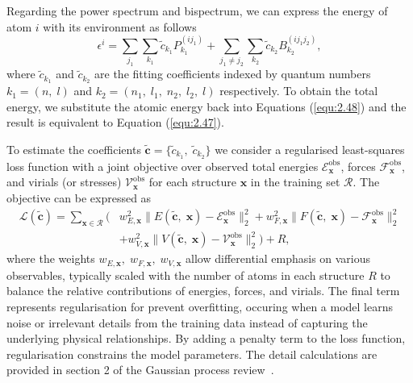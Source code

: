 Regarding the power spectrum and bispectrum, we can express the energy of atom $i$ with its environment as follows
\begin{equation}
    \label{equ:2.58}
      \epsilon^{i} = \sum_{j_{1}}\sum_{k_{1}}
      \tilde{c}_{k_{1}}
      P^{(ij_{1})}_{k_{1}} + \sum_{j_{1}\neq j_{2}}\sum_{k_{2}}
      \tilde{c}_{k_{2}}
      B^{(ij_{1}j_{2})}_{k_{2}}
      ,
\end{equation}
where $\tilde{c}_{k_{1}}$ and $\tilde{c}_{k_{2}}$ are the fitting coefficients indexed by quantum numbers $k_{1} = (n,\;l)$ and $k_{2} = (n_1,\;l_1,\;n_2,\;l_2,\;l)$ respectively. To obtain the total energy, we substitute the atomic energy back into Equations (\ref{equ:2.48}) and the result is equivalent to Equation (\ref{equ:2.47}).

To estimate the coefficients $\tilde{\mathbf{c}}=\{\tilde{c}_{k_{1}},\;\tilde{c}_{k_{2}}\}$ we consider a regularised least-squares loss function with a joint objective over observed total energies $\mathcal{E}^{\text{obs}}_{\textbf{x}}$, forces $\mathcal{F}^{\text{obs}}_{\textbf{x}}$, and virials (or stresses) $\mathcal{V}^{\text{obs}}_{\textbf{x}}$ for each structure $\textbf{x}$ in the training set $\mathcal{R}$. 
The objective can be expressed as
\begin{equation}
\label{equ:loss}
\begin{split}
\mathcal{L}(\tilde{\mathbf{c}})=
\sum_{\textbf{x}\in\mathcal{R}}\big(
&w_{E,\textbf{x}}^{2}\big\|E(\tilde{\mathbf{c}},\;\textbf{x})-\mathcal{E}^{\text{obs}}_{\textbf{x}}\big\|_2^2
+w_{F,\textbf{x}}^{2}\big\|F(\tilde{\mathbf{c}},\;\textbf{x})-\mathcal{F}^{\text{obs}}_{\textbf{x}}\big\|_2^2
\\&
+w_{V,\textbf{x}}^{2}\big\|V(\tilde{\mathbf{c}},\;\textbf{x})-\mathcal{V}^{\text{obs}}_{\textbf{x}}\big\|_2^2\big)
+R,
\end{split}
\end{equation}
where the weights $w_{E,\textbf{x}},\;w_{F,\textbf{x}},\;w_{V,\textbf{x}}$ allow differential emphasis on various observables, typically scaled with the number of atoms in each structure $R$ to balance the relative contributions of energies, forces, and virials.
The final term represents regularisation for prevent overfitting, occuring when a model learns noise or irrelevant details from the training data instead of capturing the underlying physical relationships. By adding a penalty term to the loss function, regularisation constrains the model parameters. The detail calculations are provided in section 2 of the Gaussian process review~\cite{Deringer2021}.

